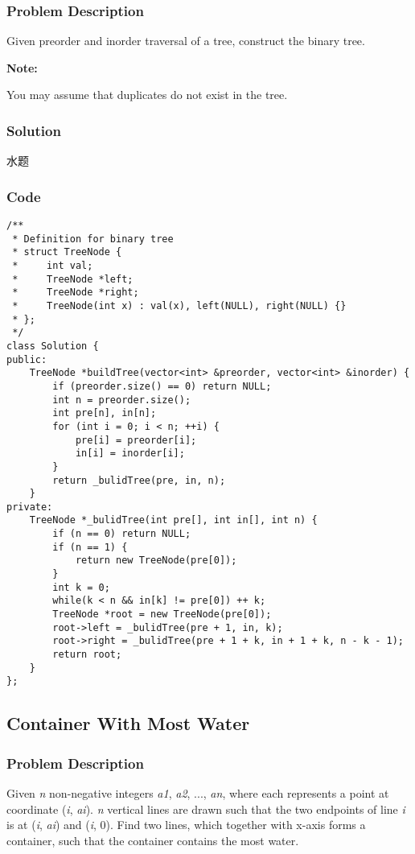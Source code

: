 \documentclass[courier]{article}
\begin{document}
\begin{CJK*}{UTF8}{gkai}
\subsubsection*{Problem Description}
Given preorder and inorder traversal of a tree, construct the binary tree.

\textbf{Note:}


You may assume that duplicates do not exist in the tree.



\subsubsection*{Solution}
水题

\subsubsection*{Code}
\begin{lstlisting}
/**
 * Definition for binary tree
 * struct TreeNode {
 *     int val;
 *     TreeNode *left;
 *     TreeNode *right;
 *     TreeNode(int x) : val(x), left(NULL), right(NULL) {}
 * };
 */
class Solution {
public:
    TreeNode *buildTree(vector<int> &preorder, vector<int> &inorder) {
        if (preorder.size() == 0) return NULL;
        int n = preorder.size();
        int pre[n], in[n];
        for (int i = 0; i < n; ++i) {
            pre[i] = preorder[i];
            in[i] = inorder[i];
        }
        return _bulidTree(pre, in, n);
    }
private:
    TreeNode *_bulidTree(int pre[], int in[], int n) {
        if (n == 0) return NULL;
        if (n == 1) {
            return new TreeNode(pre[0]);
        }
        int k = 0;
        while(k < n && in[k] != pre[0]) ++ k;
        TreeNode *root = new TreeNode(pre[0]);
        root->left = _bulidTree(pre + 1, in, k);
        root->right = _bulidTree(pre + 1 + k, in + 1 + k, n - k - 1);
        return root;
    }
}; 
\end{lstlisting}


\subsection{ Container With Most Water }

\subsubsection*{Problem Description}
Given \emph{n} non-negative integers \emph{a1}, \emph{a2}, ..., \emph{an}, where each represents a point at coordinate (\emph{i}, \emph{ai}). \emph{n} vertical lines are drawn such that the two endpoints of line \emph{i} is at (\emph{i}, \emph{ai}) and (\emph{i}, 0). Find two lines, which together with x-axis forms a container, such that the container contains the most water.


\end{CJK*}
\end{document}
